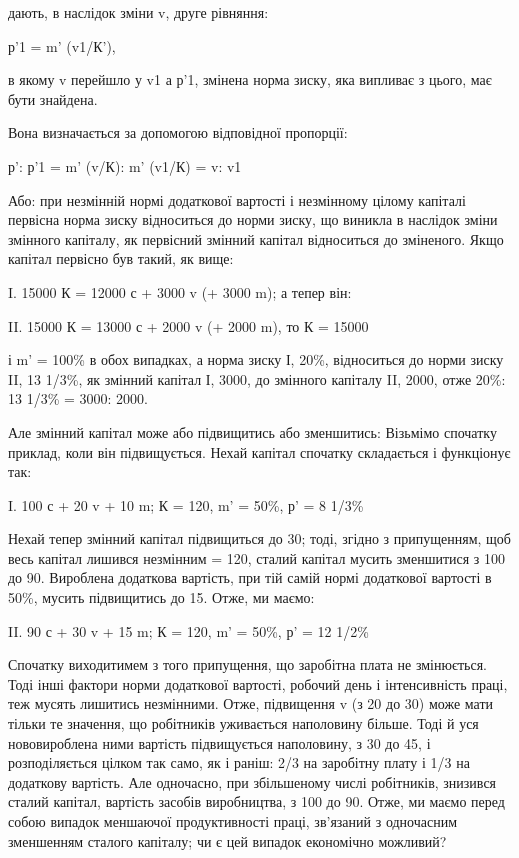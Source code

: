 \parcont{}  %
дають, в наслідок зміни v, друге рівняння:

р'1 = m' (v1/К'),

в якому v перейшло у v1 а р'1, змінена норма зиску, яка випливає
з цього, має бути знайдена.

Вона визначається за допомогою відповідної пропорції:

р': р'1 = m' (v/К): m' (v1/К) = v: v1

Або: при незмінній нормі додаткової вартості і незмінному цілому
капіталі первісна норма зиску відноситься до норми зиску,
що виникла в наслідок зміни змінного капіталу, як первісний
змінний капітал відноситься до зміненого.
Якщо капітал первісно був такий, як вище:

I. 15000 К = 12000 с + 3000 v (+ 3000 m); а тепер він:

II. 15000 К = 13000 с + 2000 v (+ 2000 m), то К = 15000

і m' = 100\% в обох випадках, а норма зиску І, 20\%, відноситься
до норми зиску II, 13 1/3\%, як змінний капітал І, 3000,
до змінного капіталу II, 2000, отже 20\%: 13 1/3\% = 3000: 2000.

Але змінний капітал може або підвищитись або зменшитись:
Візьмімо спочатку приклад, коли він підвищується. Нехай капітал
спочатку складається і функціонує так:

I. 100 с + 20 v + 10 m; К = 120, m' = 50\%, р' = 8 1/3\%

Нехай тепер змінний капітал підвищиться до 30; тоді, згідно
з припущенням, щоб весь капітал лишився незмінним = 120, сталий
капітал мусить зменшитися з 100 до 90. Вироблена додаткова
вартість, при тій самій нормі додаткової вартості в 50\%, мусить
підвищитись до 15. Отже, ми маємо:

II. 90 с + 30 v + 15 m; К = 120, m' = 50\%, р' = 12 1/2\%

Спочатку виходитимем з того припущення, що заробітна
плата не змінюється. Тоді інші фактори норми додаткової вартості,
робочий день і інтенсивність праці, теж мусять лишитись
незмінними. Отже, підвищення v (з 20 до 30) може мати тільки
те значення, що робітників уживається наполовину більше.
Тоді й уся нововироблена ними вартість підвищується наполовину,
з 30 до 45, і розподіляється цілком так само, як і раніш:
2/3 на заробітну плату і 1/3 на додаткову вартість. Але одночасно,
при збільшеному числі робітників, знизився сталий капітал,
вартість засобів виробництва, з 100 до 90. Отже, ми маємо
перед собою випадок меншаючої продуктивності праці, зв’язаний
з одночасним зменшенням сталого капіталу; чи є цей випадок
економічно можливий?
